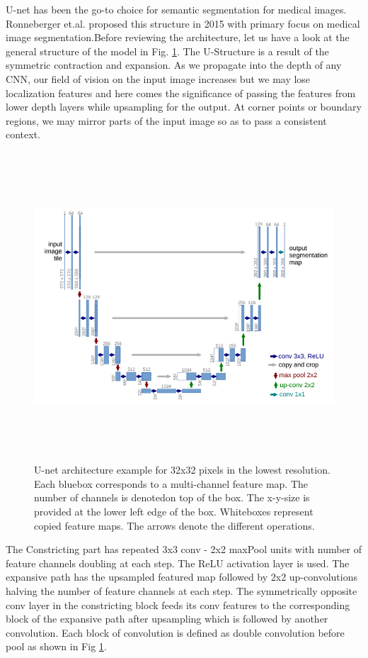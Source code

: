 \documentclass[19pt]{article}
\begin{document}
U-net has been the go-to choice for semantic segmentation for medical images. Ronneberger et.al. \cite{ronneberger2015u} proposed this structure in 2015 with primary focus on medical image segmentation.Before reviewing the architecture, let us have a look at the general structure of the model in Fig. \ref{fig:6}. The U-Structure is a result of the symmetric contraction and expansion. As we propagate into the depth of any CNN, our field of vision on the input image increases but we may lose localization features and here comes the significance of passing the features from lower depth layers while upsampling for the output. At corner points or boundary regions, we may mirror parts of the input image so as to pass a consistent context. 
\begin{center}
    \begin{figure}[!h!t!b]
        \centerline{\includegraphics[width=135mm,height=115mm]{images/unet.png}}
        \caption{U-net architecture example for 32x32 pixels in the lowest resolution. Each bluebox corresponds to a multi-channel feature map. The number of channels is denotedon top of the box. The x-y-size is provided at the lower left edge of the box. Whiteboxes represent copied feature maps. The arrows denote the different operations.}
        \label{fig:6}
    \end{figure}
\end{center}

The Constricting part has repeated 3x3 conv - 2x2 maxPool units with number of feature channels doubling at each step. The ReLU activation layer is used. The expansive path has the upsampled featured map followed by 2x2 up-convolutions halving the number of feature channels at each step. The symmetrically opposite conv layer in the constricting block feeds its conv features to the corresponding block of the expansive path after upsampling which is followed by another convolution. Each block of convolution is defined as double convolution before pool as shown in Fig \ref{fig:6}.
\end{document}
